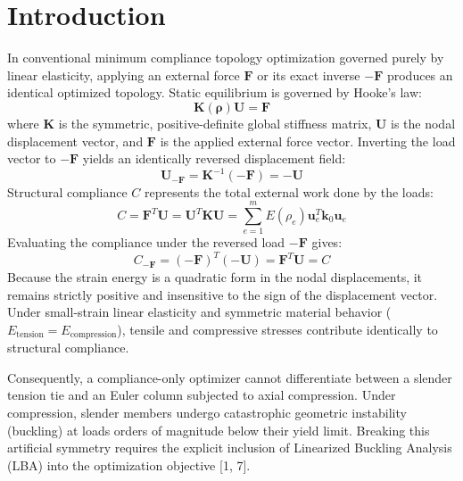 \documentclass[11pt, a4paper]{article}
\begin{document}
\section{Introduction}
In conventional minimum compliance topology optimization governed purely by linear elasticity, applying an external force $\mathbf{F}$ or its exact inverse $-\mathbf{F}$ produces an identical optimized topology. Static equilibrium is governed by Hooke's law:
\begin{equation}
\mathbf{K}(\boldsymbol{\rho}) \mathbf{U} = \mathbf{F}
\end{equation}
where $\mathbf{K}$ is the symmetric, positive-definite global stiffness matrix, $\mathbf{U}$ is the nodal displacement vector, and $\mathbf{F}$ is the applied external force vector. Inverting the load vector to $-\mathbf{F}$ yields an identically reversed displacement field:
\begin{equation}
\mathbf{U}_{-\mathbf{F}} = \mathbf{K}^{-1}(-\mathbf{F}) = -\mathbf{U}
\end{equation}
Structural compliance $C$ represents the total external work done by the loads:
\begin{equation}
C = \mathbf{F}^T \mathbf{U} = \mathbf{U}^T \mathbf{K} \mathbf{U} = \sum_{e=1}^m E(\rho_e) \mathbf{u}_e^T \mathbf{k}_0 \mathbf{u}_e
\end{equation}
Evaluating the compliance under the reversed load $-\mathbf{F}$ gives:
\begin{equation}
C_{-\mathbf{F}} = (-\mathbf{F})^T (-\mathbf{U}) = \mathbf{F}^T \mathbf{U} = C
\end{equation}
Because the strain energy is a quadratic form in the nodal displacements, it remains strictly positive and insensitive to the sign of the displacement vector. Under small-strain linear elasticity and symmetric material behavior ($E_{\text{tension}} = E_{\text{compression}}$), tensile and compressive stresses contribute identically to structural compliance.

Consequently, a compliance-only optimizer cannot differentiate between a slender tension tie and an Euler column subjected to axial compression. Under compression, slender members undergo catastrophic geometric instability (buckling) at loads orders of magnitude below their yield limit. Breaking this artificial symmetry requires the explicit inclusion of Linearized Buckling Analysis (LBA) into the optimization objective [1, 7].
\end{document}
